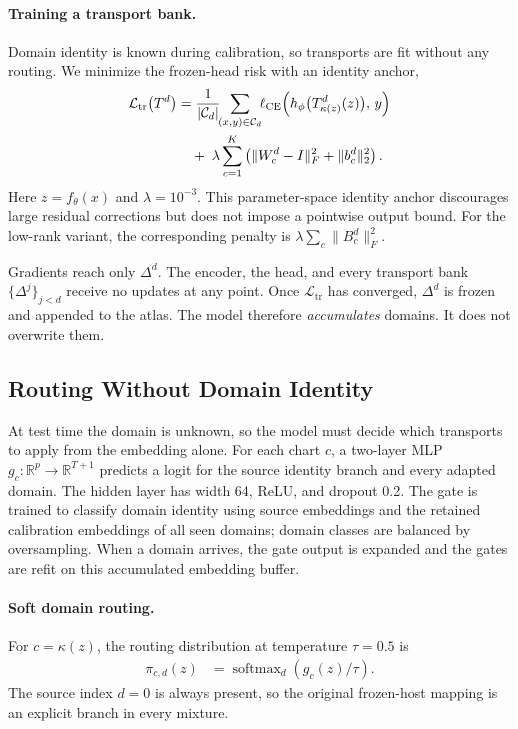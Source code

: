 \documentclass[letterpaper]{article} %
\begin{document}
\paragraph{Training a transport bank.}
Domain identity is known during calibration, so transports are fit without any
routing. We minimize the frozen-head risk with an identity anchor,
\begin{align}
\mathcal{L}_{\mathrm{tr}}\big(T^{d}\big)
&=
\frac{1}{|\mathcal{C}_d|}\!\!\sum_{(x,y)\in\mathcal{C}_d}\!\!
\ell_{\mathrm{CE}}\Big(h_\phi\big(T_{\kappa(z)}^{d}(z)\big),\,y\Big)
\notag\\
&\quad+\;
\lambda\sum_{c=1}^{K}
\left(\lVert W_c^d-I\rVert_F^2+\lVert b_c^d\rVert_2^2\right).
\label{eq:transport-loss}
\end{align}
Here $z=f_\theta(x)$ and $\lambda=10^{-3}$. This parameter-space identity
anchor discourages large residual corrections but does not impose a pointwise
output bound. For the low-rank variant, the corresponding penalty is
$\lambda\sum_c\lVert B_c^d\rVert_F^2$.

Gradients reach only $\Delta^{d}$. The encoder, the head, and every transport
bank $\{\Delta^{j}\}_{j<d}$ receive no updates at any point. Once
$\mathcal{L}_{\mathrm{tr}}$ has converged, $\Delta^{d}$ is frozen and appended to
the atlas. The model therefore \emph{accumulates} domains. It does not overwrite
them.

\subsection{Routing Without Domain Identity}
\label{sec:routing}

At test time the domain is unknown, so the model must decide which transports to
apply from the embedding alone. For each chart $c$, a two-layer MLP
$g_c:\mathbb{R}^p\rightarrow\mathbb{R}^{T+1}$ predicts a logit for the source
identity branch and every adapted domain. The hidden layer has width 64, ReLU,
and dropout 0.2. The gate is trained to classify domain identity using source
embeddings and the retained calibration embeddings of all seen domains; domain
classes are balanced by oversampling. When a domain arrives, the gate output is
expanded and the gates are refit on this accumulated embedding buffer.

\paragraph{Soft domain routing.}
For $c=\kappa(z)$, the routing distribution at temperature $\tau=0.5$ is
\begin{align}
\pi_{c,d}(z)
&=
\operatorname{softmax}_{d}\!\left(g_c(z)/\tau\right).
\label{eq:gate}
\end{align}
The source index $d=0$ is always present, so the original frozen-host mapping is
an explicit branch in every mixture.
\end{document}
